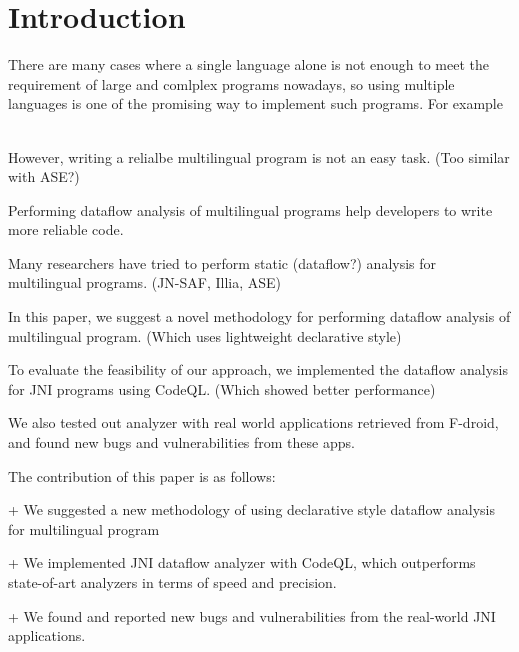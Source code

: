 \section{Introduction}
There are many cases where a single language alone is not enough to meet the requirement of large and comlplex programs nowadays,
so using multiple languages is one of the promising way to implement such programs. For example ~~~

However, writing a relialbe multilingual program is not an easy task. (Too similar with ASE?)

Performing dataflow analysis of multilingual programs help developers to write more reliable code.

Many researchers have tried to perform static (dataflow?) analysis for multilingual programs.
(JN-SAF, Illia, ASE)

In this paper, we suggest a novel methodology for performing dataflow analysis of multilingual program.
(Which uses lightweight declarative style)

To evaluate the feasibility of our approach, we implemented the dataflow analysis for JNI programs using CodeQL.
(Which showed better performance)

We also tested out analyzer with real world applications retrieved from F-droid, and found new bugs and vulnerabilities from these apps.

The contribution of this paper is as follows:

+ We suggested a new methodology of using declarative style dataflow analysis for multilingual program

+ We implemented JNI dataflow analyzer with CodeQL, which outperforms state-of-art analyzers in terms of speed and precision.

+ We found and reported new bugs and vulnerabilities from the real-world JNI applications.
